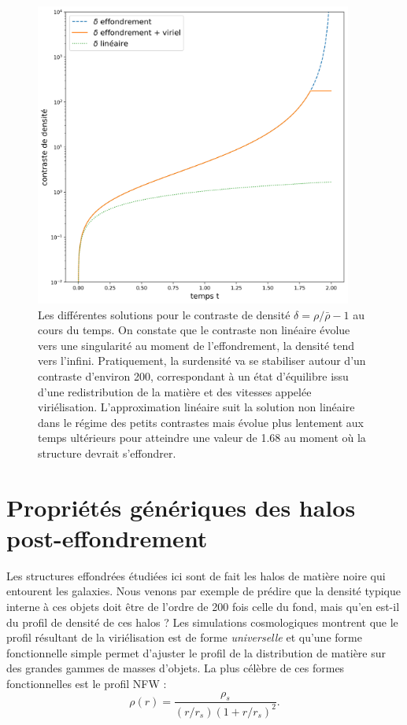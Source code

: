 \begin{figure}[htbp]
	\centering
		\includegraphics[height=10cm]{figs/delta_coll.png}
		\caption[Évolution temporelle du contraste de densité pour l'effondrement sphérique]{
		Les différentes solutions pour le contraste de densité $\delta=\rho/\bar \rho -1$ au cours du temps. On constate que le contraste non linéaire évolue vers une singularité au moment de l'effondrement, la densité tend vers l'infini. Pratiquement, la surdensité va se stabiliser autour d'un contraste d'environ 200, correspondant à un état d'équilibre issu d'une redistribution de la matière et des vitesses appelée viriélisation. L'approximation linéaire
		 suit la solution non linéaire dans le régime des petits contrastes mais évolue plus lentement aux temps ultérieurs pour atteindre une valeur de 1.68 au moment où la structure devrait s'effondrer.
		}
	\label{f:dcoll}
\end{figure}


\section{Propriétés génériques des halos post-effondrement}
Les structures effondrées étudiées ici sont de fait les halos de matière noire qui entourent les galaxies. Nous venons par exemple de prédire que la densité typique interne à ces objets doit être de l'ordre de 200 fois celle du fond, mais qu'en est-il du profil de densité de ces halos ? Les simulations cosmologiques montrent que le profil résultant de la viriélisation est de forme \textit{ universelle} et qu'une forme fonctionnelle simple permet d'ajuster le profil de la distribution de matière sur des grandes gammes de masses d'objets. La plus célèbre de ces formes fonctionnelles est le profil NFW  : 
\begin{equation}
\rho(r)=\frac{\rho_s}{(r/r_s)(1+r/r_s)^2}.
\end{equation}

